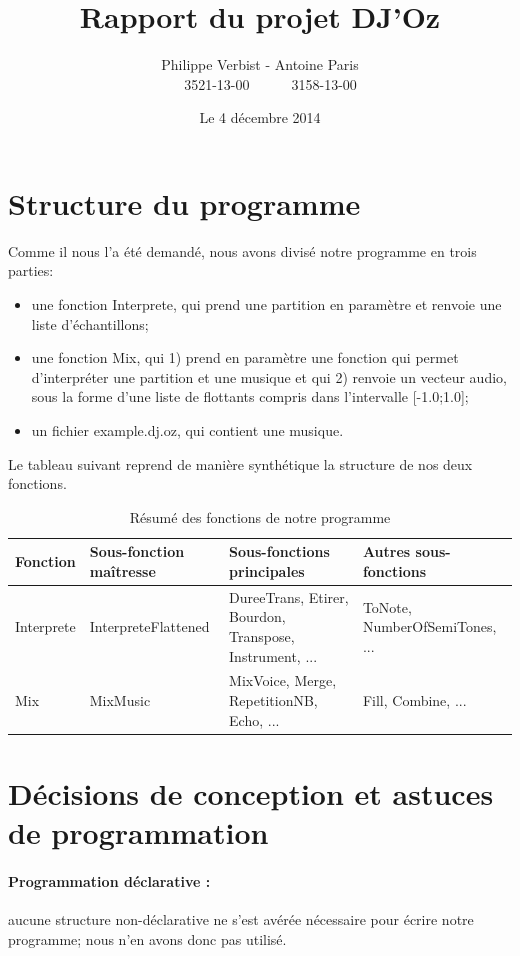 \documentclass[10pt,a4paper]{article}
\author{Philippe Verbist - Antoine Paris \\ \ \ \ 3521-13-00\ \ \ \ \ \ 3158-13-00}
\title{\textbf{Rapport du projet DJ'Oz}}
\date{Le 4 décembre 2014}
\begin{document}
\sloppy
\maketitle

\section{Structure du programme}
Comme il nous l'a été demandé, nous avons divisé notre programme en trois parties:
\begin{itemize}
	\item une fonction Interprete, qui prend une partition en paramètre et renvoie une liste d'échantillons;
	\item une fonction Mix, qui 1) prend en paramètre une fonction qui permet d'interpréter une partition 
	et une musique et qui  2) renvoie un vecteur audio, sous la forme d'une liste de flottants compris dans l'intervalle [-1.0;1.0];
	\item un fichier example.dj.oz, qui contient une musique.
\end{itemize}
\vspace{0.5 cm}

Le tableau suivant reprend de manière synthétique la structure de nos deux fonctions.

	\begin{table}[ht!]
		\centering
			\begin{tabular}{|p{}|p{}|p{0.25\textwidth}|p{}|}
			\hline
			\textbf{Fonction}		& \textbf{Sous-fonction maîtresse}& \textbf{Sous-fonctions principales} & \textbf{Autres sous-fonctions}	\\
			\hline
Interprete		&InterpreteFlattened	& DureeTrans, Etirer, Bourdon, Transpose, Instrument, ... & ToNote, NumberOfSemiTones, ...\\
			\hline
Mix 	& MixMusic &  MixVoice, Merge, RepetitionNB, Echo, ... &  Fill, Combine, ...\\
			\hline 
			\end{tabular}
		\caption{Résumé des fonctions de notre programme}
	\end{table}

\section{Décisions de conception et astuces de programmation}
\paragraph{Programmation déclarative :} 
aucune structure non-déclarative ne s'est avérée nécessaire
pour écrire notre programme; nous n'en avons donc pas utilisé.
\end{document}
